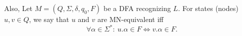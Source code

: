 Also, Let $M=(Q,\Sigma,\delta,q_0,F)$ be a DFA recognizing $L$. For states (nodes) $u,v\in Q$, we say that $u$ and $v$ are MN-equivalent iff
\[
\forall \alpha \in \Sigma^*:\ u.\alpha \in F \iff v.\alpha \in F.
\]

\begin{comment}
\subsection{Hopcroft's Minimization Algorithm}
DFA minimization is a classical and widely studied problem in Automata Theory and Formal Languages. It consists of finding the unique (up to isomorphism) finite automaton with the minimal number of states, recognizing the same regular language of a given DFA.

\begin{algorithm}
    \caption{Hopcroft's Algorithm for DFA Minimization} \label{alg:DFA_min}
    \begin{algorithmic}[1]
    \Require $M = (Q, \Sigma, \delta, q_0, F)$
    \Function{HopcroftMinimization}{$M$}
    
    \State $P \gets \{F, Q \setminus F\}$ \Comment{Initial partition}
    \State $W \gets \{F\}$ \Comment{Working set initialized with final states}
    
    \While{$W \neq \emptyset$}
        \State Remove a set $A$ from $W$
        \ForAll{$c \in \Sigma$}
            \State $X \gets \{q \in Q \mid \delta(q, c) \in A\}$ \Comment{Predecessors of $A$ via $c$}
            \ForAll{$Y \in P$ such that $X \cap Y \neq \emptyset$ and $Y \setminus X \neq \emptyset$}
                \State Replace $Y$ in $P$ with $Y_1 = X \cap Y$ and $Y_2 = Y \setminus X$
                \If{$Y \in W$}
                    \State Replace $Y$ in $W$ with $Y_1$ and $Y_2$
                \Else
                    \State Add the smaller of $Y_1$ and $Y_2$ to $W$
                \EndIf
            \EndFor
        \EndFor
    \EndWhile
    
    \State \Return the minimized DFA built from partition $P$
    \EndFunction
    \end{algorithmic}
\end{algorithm}

Algorithm \cref{alg:DFA_min} works by iteratively refining a partition of the states until no further refinement is possible, meaning all states within each set of the partition are indistinguishable. The final partition represents the equivalence classes, which correspond to the states of the minimal DFA. Here's a step-by-step explanation based on the provided pseudocode:


\end{comment}
